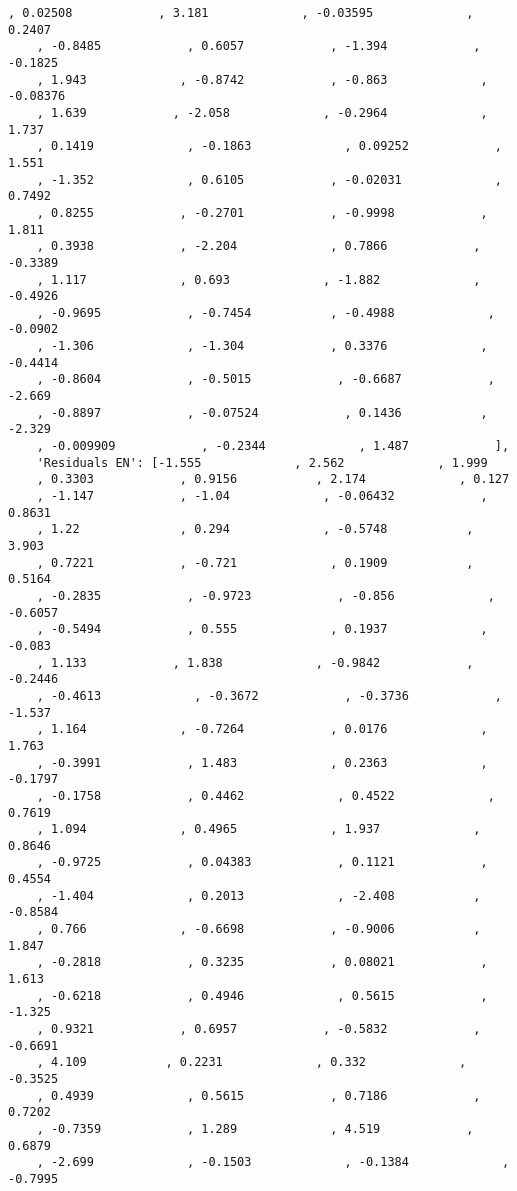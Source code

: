 \documentclass[11pt]{article}
\begin{document}
\begin{Verbatim}[tabsize=4]
	, 0.02508            , 3.181             , -0.03595             , 0.2407
	, -0.8485            , 0.6057            , -1.394            , -0.1825
	, 1.943             , -0.8742            , -0.863             , -0.08376
	, 1.639            , -2.058             , -0.2964             , 1.737
	, 0.1419             , -0.1863             , 0.09252            , 1.551
	, -1.352             , 0.6105            , -0.02031             , 0.7492
	, 0.8255            , -0.2701            , -0.9998            , 1.811
	, 0.3938            , -2.204             , 0.7866            , -0.3389
	, 1.117             , 0.693             , -1.882             , -0.4926
	, -0.9695            , -0.7454           , -0.4988             , -0.0902
	, -1.306             , -1.304            , 0.3376             , -0.4414
	, -0.8604            , -0.5015            , -0.6687            , -2.669
	, -0.8897            , -0.07524            , 0.1436           , -2.329
	, -0.009909            , -0.2344             , 1.487            ],
    'Residuals EN': [-1.555             , 2.562             , 1.999
	, 0.3303            , 0.9156           , 2.174             , 0.127
	, -1.147            , -1.04             , -0.06432            , 0.8631
	, 1.22              , 0.294             , -0.5748           , 3.903
	, 0.7221            , -0.721             , 0.1909           , 0.5164
	, -0.2835            , -0.9723            , -0.856             , -0.6057
	, -0.5494            , 0.555             , 0.1937             , -0.083
	, 1.133            , 1.838             , -0.9842            , -0.2446
	, -0.4613             , -0.3672            , -0.3736            , -1.537
	, 1.164             , -0.7264            , 0.0176             , 1.763
	, -0.3991            , 1.483             , 0.2363             , -0.1797
	, -0.1758            , 0.4462             , 0.4522             , 0.7619
	, 1.094             , 0.4965             , 1.937             , 0.8646
	, -0.9725            , 0.04383            , 0.1121            , 0.4554
	, -1.404             , 0.2013             , -2.408           , -0.8584
	, 0.766             , -0.6698            , -0.9006           , 1.847
	, -0.2818            , 0.3235            , 0.08021            , 1.613
	, -0.6218            , 0.4946             , 0.5615            , -1.325
	, 0.9321            , 0.6957            , -0.5832            , -0.6691
	, 4.109           , 0.2231             , 0.332             , -0.3525
	, 0.4939             , 0.5615            , 0.7186            , 0.7202
	, -0.7359            , 1.289             , 4.519            , 0.6879
	, -2.699             , -0.1503             , -0.1384             , -0.7995

\end{Verbatim}
\end{document}
